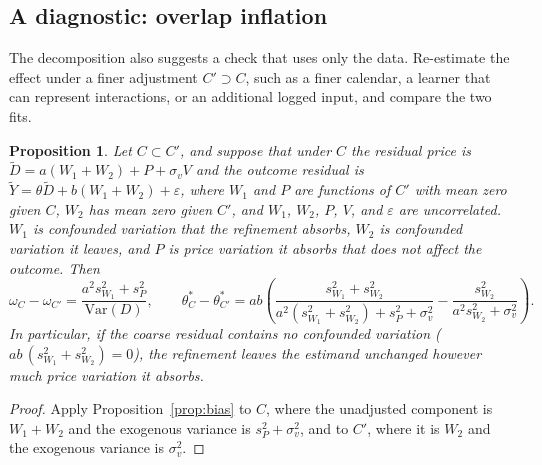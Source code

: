 \documentclass[11pt]{article}
\newtheorem{proposition}{Proposition}
\theoremstyle{remark}
\newcommand{\Var}{\mathrm{Var}}
\begin{document}
\subsection{A diagnostic: overlap inflation}
\label{sec:diagtheory}

The decomposition also suggests a check that uses only the data. Re-estimate the effect under a finer adjustment $C' \supset C$, such as a finer calendar, a learner that can represent interactions, or an additional logged input, and compare the two fits.

\begin{proposition}
\label{prop:diagnostic}
Let $C \subset C'$, and suppose that under $C$ the residual price is $\tilde D = a(W_1 + W_2) + P + \sigma_v V$ and the outcome residual is $\tilde Y = \theta \tilde D + b(W_1 + W_2) + \varepsilon$, where $W_1$ and $P$ are functions of $C'$ with mean zero given $C$, $W_2$ has mean zero given $C'$, and $W_1$, $W_2$, $P$, $V$, and $\varepsilon$ are uncorrelated. $W_1$ is confounded variation that the refinement absorbs, $W_2$ is confounded variation it leaves, and $P$ is price variation it absorbs that does not affect the outcome. Then
\[
\omega_C - \omega_{C'} = \frac{a^2 s_{W_1}^2 + s_P^2}{\Var(D)}, \qquad
\theta^\ast_C - \theta^\ast_{C'} = ab\left(\frac{s_{W_1}^2 + s_{W_2}^2}{a^2 (s_{W_1}^2 + s_{W_2}^2) + s_P^2 + \sigma_v^2} - \frac{s_{W_2}^2}{a^2 s_{W_2}^2 + \sigma_v^2}\right).
\]
In particular, if the coarse residual contains no confounded variation ($ab\,(s_{W_1}^2 + s_{W_2}^2) = 0$), the refinement leaves the estimand unchanged however much price variation it absorbs.
\end{proposition}

\begin{proof}
Apply Proposition~\ref{prop:bias} to $C$, where the unadjusted component is $W_1 + W_2$ and the exogenous variance is $s_P^2 + \sigma_v^2$, and to $C'$, where it is $W_2$ and the exogenous variance is $\sigma_v^2$.
\end{proof}
\end{document}
